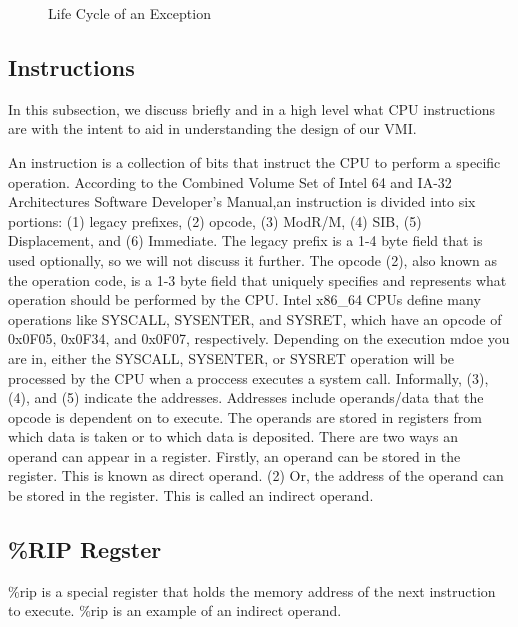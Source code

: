 \documentclass{report}
\begin{document}
\begin{spacing}{1.5}
\newpage
\vfill
\begin{figure}[ht]
  \caption{Life Cycle of an Exception}
\end{figure}

\subsection{Instructions}

{\large
In this subsection, we discuss briefly and in a high level what CPU instructions are with the intent to aid in understanding the design of our VMI.
\newline
}

{\large
An instruction is a collection of bits that instruct the CPU to perform a specific operation. According to the Combined Volume Set of Intel 64 and IA-32 Architectures Software Developer’s Manual,an instruction is divided into six portions: (1) legacy prefixes, (2) opcode, (3) ModR/M, (4) SIB, (5) Displacement, and (6) Immediate. The legacy prefix is a 1-4 byte field that is used optionally, so we will not discuss it further. The opcode (2), also known as the operation code, is a 1-3 byte field that uniquely specifies and represents what operation should be performed by the CPU. Intel x86\_64 CPUs define many operations like SYSCALL, SYSENTER, and SYSRET, which have an opcode of 0x0F05, 0x0F34, and 0x0F07, respectively. Depending on the execution mdoe you are in, either the SYSCALL, SYSENTER, or SYSRET operation will be processed by the CPU when a proccess executes a system call. Informally, (3), (4), and (5) indicate the addresses. Addresses include operands/data that the opcode is dependent on to execute. The operands are stored in registers from which data is taken or to which data is deposited. There are two ways an operand can appear in a register. Firstly, an operand can be stored in the register. This is known as direct operand. (2) Or, the address of the operand can be stored in the register. This is called an indirect operand.
\newline
}



\subsection{\%RIP Regster}

{\large
\%rip is a special register that holds the memory address of the next instruction to execute. \%rip is an example of an indirect operand.
\newline
}



\end{spacing}
\end{document}
